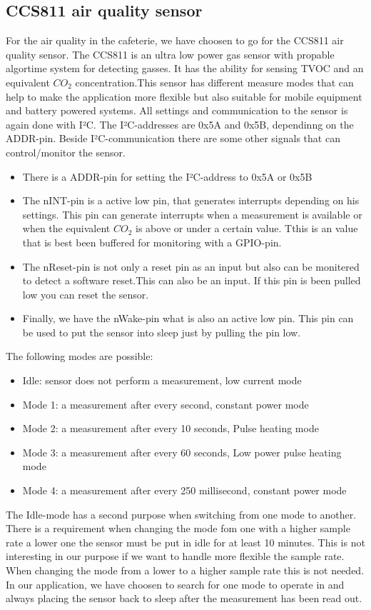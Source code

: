 \documentclass[11pt,a4paper]{article}
\begin{document}
\subsection{CCS811 air quality sensor}
For the air quality in the cafeterie, we have choosen to go for the CCS811 air quality sensor. The CCS811 is an ultra low power gas sensor with propable algortime system for detecting gasses. It has  the ability for sensing TVOC and an equivalent $CO_{2}$ concentration.This sensor has different measure modes that can help to make the application more flexible but also suitable for mobile equipment and battery powered systems. All settings and communication to the sensor is again done with I²C. The I²C-addresses are 0x5A and 0x5B, dependinng on the ADDR-pin. Beside I²C-communication there are some other signals that can control/monitor the sensor. 
\begin{itemize}
	\item There is a ADDR-pin for setting the I²C-address to 0x5A or 0x5B
	\item The nINT-pin is a active low pin, that generates interrupts depending on his settings. This pin can generate interrupts when a measurement is available or when the equivalent $CO_{2}$ is above or under a certain value. Tthis is an value that is best been buffered for monitoring with a GPIO-pin.
	\item The nReset-pin is not only a reset pin as an input but also can be monitered to detect a software reset.This can also be an input. If this pin is been pulled low you can reset the sensor.
	\item Finally, we have the nWake-pin what is also an active low pin. This pin can be used to put the sensor into sleep just by pulling the pin low.
\end{itemize}
The following modes are possible:
\begin{itemize}
	\item Idle: sensor does not perform a measurement, low current mode
	\item Mode 1: a measurement after every second, constant power mode
	\item Mode 2:  a measurement after every 10 seconds, Pulse heating mode
	\item Mode 3:  a measurement after every 60 seconds, Low power pulse heating mode
	\item Mode 4: a measurement after every 250 millisecond, constant power mode
\end{itemize}
The Idle-mode has a second purpose when switching from one mode to another. There is a requirement when changing the mode fom one with a higher sample rate a lower one the sensor must be put in idle for at least 10 minutes. This is not interesting in our purpose if we want to handle more flexible the sample rate. When changing the mode from a lower to a higher sample rate this is not needed. In our application, we have choosen to search for one mode to operate in and always placing the sensor back to sleep after the measurement has been read out.
\end{document}
